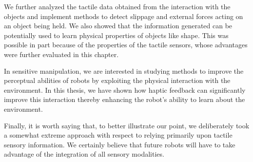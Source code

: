 We further analyzed the tactile data obtained from the interaction
with the objects and implement methods to detect slippage and
external forces acting on an object being held. We also showed
that the information generated can be potentially used to learn
physical properties of objects like shape. This was possible in
part because of the properties of the tactile sensors, whose
advantages were further evaluated in this chapter.


In sensitive manipulation, we are interested in studying methods
to improve the perceptual abilities of robots by exploiting the
physical interaction with the environment. In this thesis, we have
shown how haptic feedback can significantly improve this
interaction thereby enhancing the robot's ability to learn about
the environment.

Finally, it is worth saying that, to better illustrate our point,
we deliberately took a somewhat extreme approach with respect to
relying primarily upon tactile sensory information. We certainly
believe that future robots will have to take advantage of the
integration of all sensory modalities.


%
%
%
%
%




